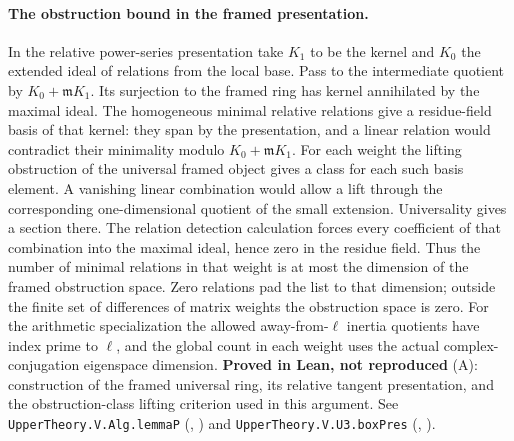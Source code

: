 \paragraph{The obstruction bound in the framed presentation.}
In the relative power-series presentation take $K_1$ to be the kernel
and $K_0$ the extended ideal of relations from the local base.
Pass to the intermediate quotient by $K_0+\mathfrak m K_1$.
Its surjection to the framed ring has kernel annihilated by the maximal
ideal. The homogeneous minimal relative relations give a residue-field
basis of that kernel: they span by the presentation, and a linear
relation would contradict their minimality modulo $K_0+\mathfrak m K_1$.
For each weight the lifting obstruction of the universal framed object
gives a class for each such basis element. A vanishing linear combination
would allow a lift through the corresponding one-dimensional quotient
of the small extension. Universality gives a section there. The relation
detection calculation forces every coefficient of that combination into
the maximal ideal, hence zero in the residue field. Thus the number
of minimal relations in that weight is at most the dimension of the
framed obstruction space. Zero relations pad the list to that dimension;
outside the finite set of differences of matrix weights the obstruction
space is zero. For the arithmetic specialization the allowed away-from-$\ell$
inertia quotients have index prime to $\ell$, and the global count
in each weight uses the actual complex-conjugation eigenspace dimension.
\textbf{Proved in Lean, not reproduced} (A): construction of the
framed universal ring, its relative tangent presentation, and the
obstruction-class lifting criterion used in this argument.
See \nolinkurl{UpperTheory.V.Alg.lemmaP}
(, )
and \nolinkurl{UpperTheory.V.U3.boxPres}
(, ).

